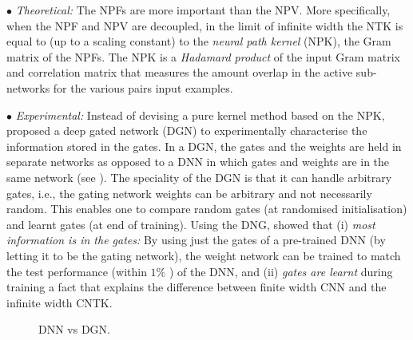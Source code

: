 $\bullet$ \emph{Theoretical:} The NPFs are more important than the NPV. More specifically, when the NPF and NPV are decoupled, in the limit of infinite width the NTK is equal to (up to a scaling constant) to the \emph{neural path kernel} (NPK), the Gram matrix of the NPFs. The NPK is a \emph{Hadamard product} of the input Gram matrix and correlation matrix that measures the amount overlap in the active sub-networks for the various pairs input examples.

$\bullet$ \emph{Experimental:} Instead of devising a pure kernel method based on the NPK, \cite{npk} proposed a deep gated network (DGN) to experimentally characterise the information stored in the gates. In a DGN, the gates and the weights are held in separate networks as opposed to a DNN in which gates and weights are in the same network (see ). The speciality of the DGN is that it can handle arbitrary gates, i.e., the gating network weights can be arbitrary and not necessarily random. This enables one to compare random gates (at randomised initialisation) and learnt gates (at end of training). Using the DNG, \cite{npk} showed that (i)  \emph{most information is in the gates:} By using just the gates of a pre-trained DNN (by letting it to be the gating network), the weight network can be trained to match the test performance (within $1\%$ ) of the DNN, and (ii) \emph{gates are learnt} during training a fact that explains the difference between finite width CNN and the infinite width CNTK.  
\FloatBarrier
\begin{figure}[h]
\centering
{}
\caption{DNN vs DGN.}
\label{fig:dgn}
\end{figure}

